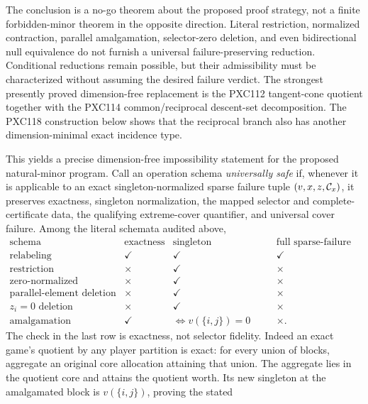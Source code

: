 \documentclass[11pt]{article}
\begin{document}
The conclusion is a no-go theorem about the proposed proof strategy, not a
finite forbidden-minor theorem in the opposite direction.  Literal
restriction, normalized contraction, parallel amalgamation, selector-zero
deletion, and even bidirectional null equivalence do not furnish a universal
failure-preserving reduction.  Conditional reductions remain possible, but
their admissibility must be characterized without assuming the desired
failure verdict.  The strongest presently proved dimension-free replacement
is the PXC112 tangent-cone quotient together with the PXC114 common/reciprocal
descent-set decomposition.  The PXC118 construction below shows that the
reciprocal branch also has another dimension-minimal exact incidence type.

This yields a precise dimension-free impossibility statement for the
proposed natural-minor program.  Call an operation schema \emph{universally
safe} if, whenever it is applicable to an exact singleton-normalized sparse
failure tuple \((v,x,z,{\cal C}_x)\), it preserves exactness, singleton
normalization, the mapped selector and complete-certificate data, the
qualifying extreme-cover quantifier, and universal cover failure.  Among the
literal schemata audited above,
\begin{equation}
\begin{array}{c|c|c|c}
\text{schema}&\text{exactness}&\text{singleton normalization}
             &\text{full sparse-failure tuple}\\ \hline
\text{relabeling}&\checkmark&\checkmark&\checkmark\\
\text{restriction}&\times&\checkmark&\times\\
\text{zero-normalized contraction}&\times&\checkmark&\times\\
\text{parallel-element deletion}&\times&\checkmark&\times\\
\text{\(z_i=0\) deletion}&\times&\checkmark&\times\\
\text{amalgamation}&\checkmark&
        \Longleftrightarrow v(\{i,j\})=0&\times .
\end{array}                                                  \tag{PXC117a}
\end{equation}
The check in the last row is exactness, not selector fidelity.  Indeed an
exact game's quotient by any player partition is exact: for every union of
blocks, aggregate an original core allocation attaining that union.  The
aggregate lies in the quotient core and attains the quotient worth.  Its
new singleton at the amalgamated block is \(v(\{i,j\})\), proving the stated
\end{document}
